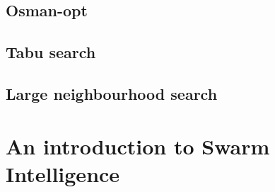 \subsection{Osman-opt}

\subsection{Tabu search}


\subsection{Large neighbourhood search}


\section{An introduction to Swarm Intelligence}







